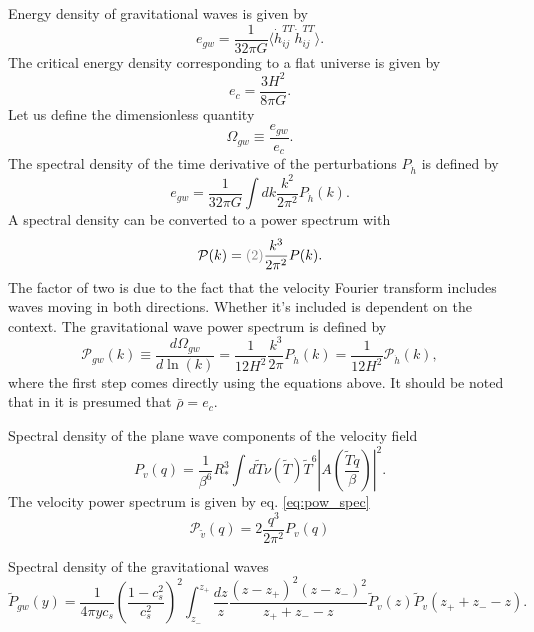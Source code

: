 Energy density of gravitational waves is given by
\begin{equation}
e_{gw} = \frac{1}{32 \pi G} \langle \dot{h}_{ij}^{TT} \dot{h}_{ij}^{TT} \rangle.
\end{equation}
\cites[eq. 3.3]{hindmarsh_gw_pt_2019}[eq. 1.135, 7.193]{maggiore_gw_2008}
The critical energy density corresponding to a flat universe is given by
\cite[eq. 7.196]{maggiore_gw_2008}
\begin{equation}
e_c = \frac{3 H^2}{8 \pi G}.
\label{eq:e_crit}
\end{equation}
Let us define the dimensionless quantity
\begin{equation}
\Omega_{gw} \equiv \frac{e_{gw}}{e_c}.
\label{eq:omega_gw}
\end{equation}
The spectral density of the time derivative of the perturbations $P_{\dot{h}}$ is defined by
\cite[eq. 3.5]{hindmarsh_gw_pt_2019}
\begin{equation}
e_{gw} = \frac{1}{32 \pi G} \int dk \frac{k^2}{2 \pi^2} P_{\dot{h}}(k).
\end{equation}
A spectral density can be converted to a power spectrum with
\begin{equation}
\mathcal{P}(k) = \textcolor{gray}{(2)} \frac{k^3}{2 \pi^2} P(k).
\label{eq:pow_spec}
\end{equation}
The factor of two is due to the fact that the velocity Fourier transform includes waves moving in both directions.
Whether it's included is dependent on the context.
The gravitational wave power spectrum is defined by
\begin{equation}
\mathcal{P}_{gw}(k)
\equiv \frac{d \Omega_{gw}}{d \ln (k)}
= \frac{1}{12 H^2} \frac{k^3}{2\pi} P_{\dot{h}}(k)
= \frac{1}{12 H^2} \mathcal{P}_{\dot{h}}(k),
\end{equation}
where the first step comes directly using the equations above.
It should be noted that in \cite[eq. 3.6]{hindmarsh_gw_pt_2019} it is presumed that $\bar{\rho}=e_c$.


Spectral density of the plane wave components of the velocity field \cite[eq. 4.17]{hindmarsh_gw_pt_2019}
\begin{equation}
P_v(q) = \frac{1}{\beta^6}{R_*^3} \int d\tilde{T} \nu(\tilde{T}) \tilde{T}^6 |A(\frac{\tilde{T}q}{\beta})|^2.
\end{equation}
The velocity power spectrum is given by eq. \eqref{eq:pow_spec} \cite[eq. 4.18]{hindmarsh_gw_pt_2019}
\begin{equation}
\mathcal{P}_{\tilde{v}} (q) = 2 \frac{q^3}{2\pi^2} P_v(q)
\end{equation}

Spectral density of the gravitational waves \cite[eq. 3.47]{hindmarsh_gw_pt_2019}
\begin{equation}
\tilde{P}_{gw}(y)
= \frac{1}{4 \pi y c_s}
\left( \frac{1 - c_s^2}{c_s^2} \right)^2
\int_{z_-}^{z_+} \frac{dz}{z}
\frac{(z-z_+)^2(z-z_-)^2}{z_+ + z_- - z}
\tilde{P}_v (z) \tilde{P}_v (z_+ + z_- - z).
\end{equation}

\cites{hindmarsh_gw_pt_2019}[ch. 8]{lecture_notes}
